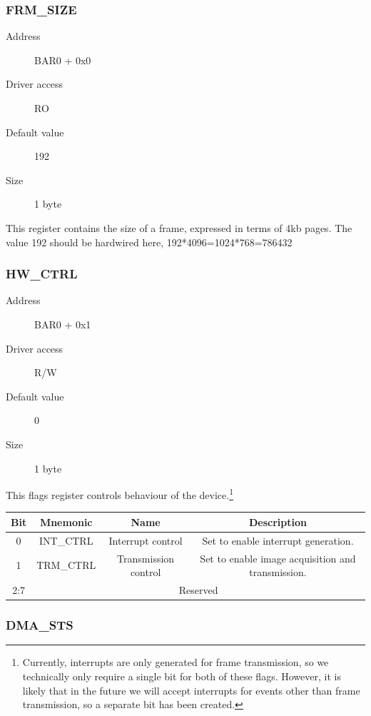 \documentclass[12pt]{article}
\begin{document}
\subsubsection{FRM\_SIZE}

\begin{description}
\item[Address] BAR0 + 0x0
\item[Driver access] RO
\item[Default value] 192
\item[Size] 1 byte
\end{description}

This register contains the size of a frame, expressed in terms of 4kb pages. The value 192 should be hardwired here, 192*4096=1024*768=786432

\subsubsection{HW\_CTRL}

\begin{description}
\item[Address] BAR0 + 0x1
\item[Driver access] R/W
\item[Default value] 0
\item[Size] 1 byte
\end{description}

This flags register controls behaviour of the device.\footnote{Currently, interrupts are only generated for frame transmission, so we technically only require a single bit for both of these flags. However, it is likely that in the future we will accept interrupts for events other than frame transmission, so a separate bit has been created.}

\begin{tabular}{|c|c|c|c|}\hline
\textbf{Bit} & \textbf{Mnemonic} & \textbf{Name} & \textbf{Description} \\ \hline
0 & INT\_CTRL & Interrupt control & Set to enable interrupt generation. \\ \hline
1 & TRM\_CTRL & Transmission control & Set to enable image acquisition and transmission. \\ \hline
2:7 & \multicolumn{3}{|c|}{Reserved} \\ \hline
\end{tabular}

\subsubsection{DMA\_STS}
\end{document}
